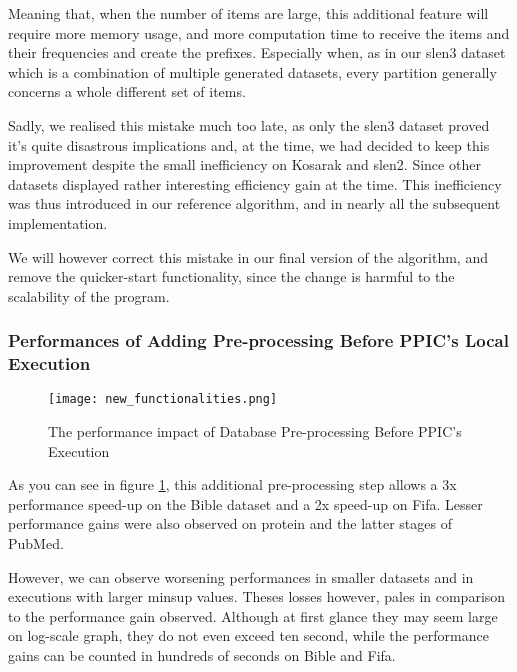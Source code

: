 \documentclass{eplmastersthesis}
\begin{document}
Meaning that, when the number of items are large, this additional feature will require more memory usage, and more computation time to receive the items and their frequencies and create the prefixes. Especially when, as in our slen3 dataset which is a combination of multiple generated datasets, every partition generally concerns a whole different set of items.\newline

Sadly, we realised this mistake much too late, as only the slen3 dataset proved it's quite disastrous implications and, at the time, we had decided to keep this improvement despite the small inefficiency on Kosarak and slen2. Since other datasets displayed rather interesting efficiency gain at the time. This inefficiency was thus introduced in our reference algorithm, and in nearly all the subsequent implementation. \newline

We will however correct this mistake in our final version of the algorithm, and remove the quicker-start functionality, since the change is harmful to the scalability of the program.

\subsubsection{Performances of Adding Pre-processing Before PPIC's Local Execution}

\begin{figure}[h]
  \centering
  \texttt{[image: new\_functionalities.png]}
  \caption{The performance impact of Database Pre-processing Before PPIC's Execution}
  \label{fig:clean_before_PPIC}
\end{figure}

As you can see in figure \ref{fig:clean_before_PPIC}, this additional pre-processing step allows a 3x performance speed-up on the Bible dataset and a 2x speed-up on Fifa. Lesser performance gains were also observed on protein and the latter stages of PubMed. \newline

However, we can observe worsening performances in smaller datasets and in executions with larger minsup values. Theses losses however, pales in comparison to the performance gain observed. Although at first glance they may seem large on log-scale graph, they do not even exceed ten second, while the performance gains can be counted in hundreds of seconds on Bible and Fifa. \newline
\end{document}
